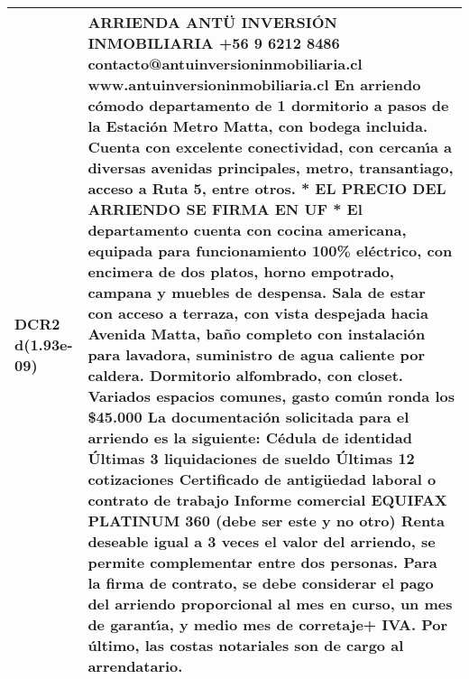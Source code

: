 \begin{table}[H]
\begin{tabular}{|l|m{35em}|}
\hline DCR2 d(1.93e-09) & ARRIENDA ANT\"U INVERSI\'ON INMOBILIARIA +56 9 6212 8486 contacto@antuinversioninmobiliaria.cl www.antuinversioninmobiliaria.cl  En arriendo c\'omodo departamento de 1 dormitorio a pasos de la Estaci\'on Metro Matta, con bodega incluida. Cuenta con excelente conectividad, con cercan{\'\i}a a diversas avenidas principales, metro, transantiago, acceso a Ruta 5, entre otros.  * EL PRECIO DEL ARRIENDO SE FIRMA EN UF *  El departamento cuenta con cocina americana, equipada para funcionamiento 100\% el\'ectrico, con encimera de dos platos, horno empotrado, campana y muebles de despensa. Sala de estar con acceso a terraza, con vista despejada hacia Avenida Matta, ba\~no completo con instalaci\'on para lavadora, suministro de agua caliente por caldera. Dormitorio alfombrado, con closet. Variados espacios comunes, gasto com\'un ronda los \$45.000  La documentaci\'on solicitada para el arriendo es la siguiente:  C\'edula de identidad \'Ultimas 3 liquidaciones de sueldo \'Ultimas 12 cotizaciones Certificado de antig\"uedad laboral o contrato de trabajo Informe comercial EQUIFAX PLATINUM 360 (debe ser este y no otro) Renta deseable igual a 3 veces el valor del arriendo, se permite complementar entre dos personas.  Para la firma de contrato, se debe considerar el pago del arriendo proporcional al mes en curso, un mes de garant{\'\i}a, y medio mes de corretaje+ IVA. Por \'ultimo, las costas notariales son de cargo al arrendatario. \\
\hline
\end{tabular}
\end{table}
